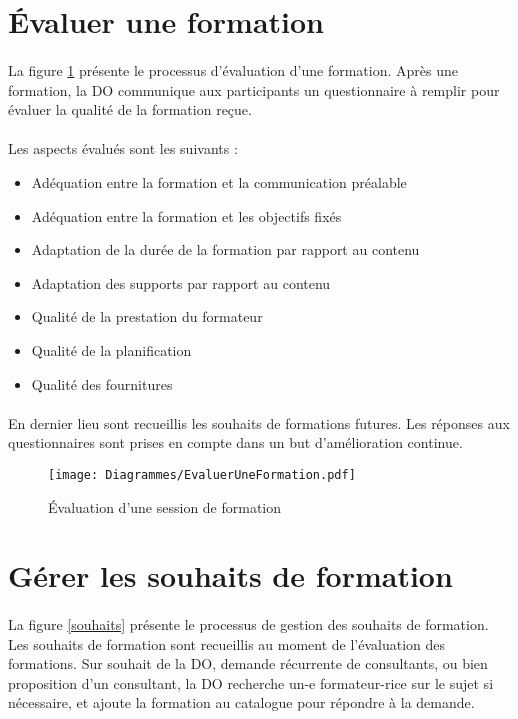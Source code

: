 \section{Évaluer une formation}
\label{sec:eval}
\paragraph{} La figure \ref{evalFormation} présente le processus d'évaluation d'une formation. Après une formation, la DO communique aux participants un questionnaire à remplir pour évaluer la qualité de la formation reçue.
\paragraph{} Les aspects évalués sont les suivants :
\begin{itemize}
	\item Adéquation entre la formation et la communication préalable
	\item Adéquation entre la formation et les objectifs fixés
	\item Adaptation de la durée de la formation par rapport au contenu
	\item Adaptation des supports par rapport au contenu
	\item Qualité de la prestation du formateur
	\item Qualité de la planification
	\item Qualité des fournitures
\end{itemize}

\paragraph{} En dernier lieu sont recueillis les souhaits de formations futures. Les réponses aux questionnaires sont prises en compte dans un but d'amélioration continue.


\begin{figure}[H]
\centering
	\begin{sideways}
		\texttt{[image: Diagrammes/EvaluerUneFormation.pdf]}
	\end{sideways}
	\caption{Évaluation d'une session de formation}
	\label{evalFormation}
\end{figure}


\section{Gérer les souhaits de formation}
\paragraph{} La figure \ref{souhaits} présente le processus de gestion des souhaits de formation. Les souhaits de formation sont recueillis au moment de l'évaluation des formations. Sur souhait de la DO, demande récurrente de consultants, ou bien proposition d'un consultant, la DO recherche un-e formateur-rice sur le sujet si nécessaire, et ajoute la formation au catalogue pour répondre à la demande. 

